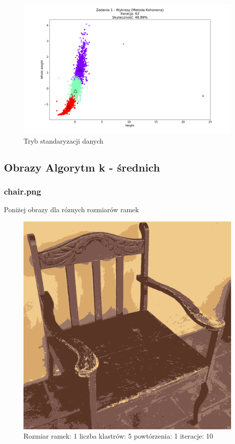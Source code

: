 \documentclass{classrep}
\begin{document}
{{{                \begin{figure}[!htbp]
                    \centering
                    \includegraphics[width=\textwidth,width=90mm]{wykresy/plot_kohonenAbaloneStandardised.png}
                    \caption{Tryb standaryzacji danych}
                \end{figure}
                \FloatBarrier
            }

            \subsection{Obrazy Algorytm k - średnich}
            {
                \subsubsection{chair.png}
                {

                    Poniżej obrazy dla róznych rozmiarów ramek
                    \begin{figure}[!htbp]
                        \centering
                        \includegraphics[width=\textwidth,width=90mm]{obrazy/chair_R1_K5_P1_It10.png}
                        \caption{Rozmiar ramek: 1 liczba klastrów: 5 powtórzenia: 1 iteracje: 10 }
                    \end{figure}

}}}}
\end{document}
